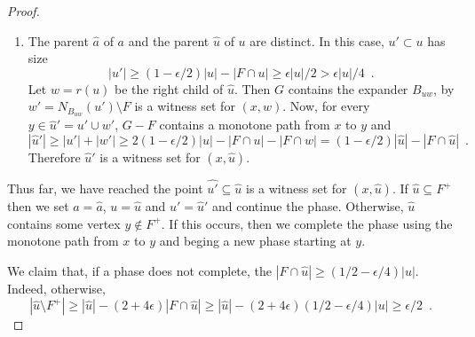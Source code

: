 \documentclass{patmorin}
\begin{document}
\begin{proof}
\begin{enumerate}
    \item The parent $\hat{a}$ of $a$ and the parent $\hat{u}$ of $u$ are distinct.  In this case, $u'\subset u$ has size
    \[  |u'| \ge (1-\epsilon/2)|u|-|F\cap u| \ge \epsilon|u|/2 > \epsilon|u|/4 \enspace .\]
		  Let $w=r(u)$ be the right child of $\hat{u}$.  Then $G$ contains the expander $B_{uw}$, by  $w'=N_{B_{uw}}(u')\setminus F$
		  is a witness set for $(x,w)$. 
		   Now, for every $y\in \hat{u}'=u'\cup w'$, $G-F$ contains a monotone path from $x$ to $y$ and 
		  \[ |\hat{u}'| \ge |u'|+|w'| \ge 2(1-\epsilon/2)|u| - |F\cap u| - |F\cap w| = (1-\epsilon/2)|\hat{u}| - |F\cap \hat{u}|  \enspace .
	    \]
		  Therefore $\hat{u}'$ is a witness set for $(x,\hat{u})$.
  \end{enumerate}

  Thus far, we have reached the point $\hat{u'}\subseteq \hat{u}$ is a
  witness set for $(x,\hat{u})$.  If $\hat{u}\subseteq F^+$ then we set
  $a=\hat{a}$, $u=\hat{u}$ and $u'=\hat{u}'$ and continue the phase.
  Otherwise, $\hat{u}$ contains some vertex $y\not\in F^+$.  If this
  occurs, then we complete the phase using the monotone path from $x$
  to $y$ and beging a new phase starting at $y$.

  We claim that, if a phase does not complete, the $|F\cap\hat{u}|
  \ge (1/2-\epsilon/4)|u|$.  Indeed, otherwise, 
  \[
	  |\hat{u}\setminus F^+| \ge
	  |\hat{u}|-(2+4\epsilon)|F\cap\hat{u}| \ge
	  |\hat{u}|-(2+4\epsilon)(1/2-\epsilon/4)|u|\ge
	  \epsilon/2 \enspace .
  \]
	

\end{proof}
\end{document}
